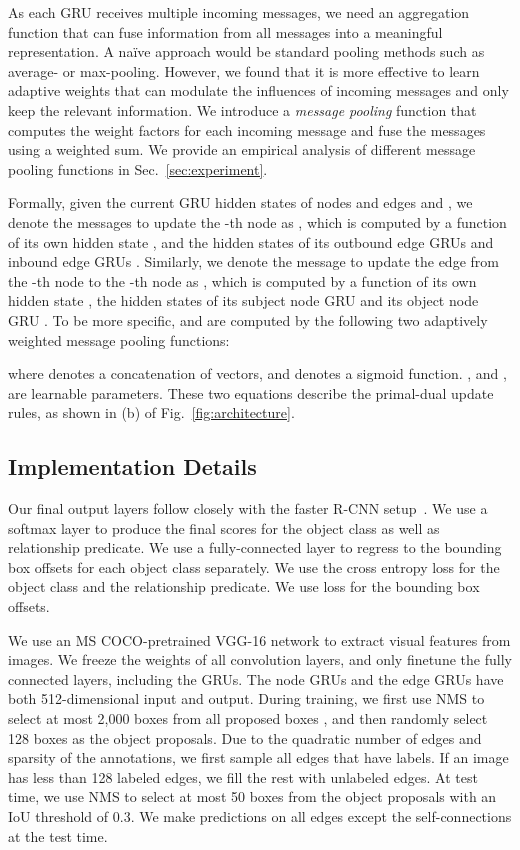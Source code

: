\documentclass[10pt,twocolumn,letterpaper]{article}
\begin{document}
As each GRU receives multiple incoming messages, we need an aggregation function that can fuse information from all messages into a meaningful representation.
A na\"{i}ve approach would be standard pooling methods such as average- or max-pooling. However, we found that it is more effective to learn adaptive weights that can modulate the influences of incoming messages and only keep the relevant information. We introduce a \emph{message pooling} function that computes the weight factors for each incoming message and  fuse the messages using a weighted sum. We provide an empirical analysis of different message pooling functions in Sec.~\ref{sec:experiment}. 

Formally, given the current GRU hidden states of nodes and edges  and ,
we denote the messages to update the -th node as , which is computed by a function of its own hidden state , and the hidden states of its outbound edge GRUs  and inbound edge GRUs . Similarly, we denote the message to update the edge from the -th node to the -th node as , which is computed by a function of its own hidden state , the hidden states of its subject node GRU  and its object node GRU . To be more specific,  and  are computed by the following two adaptively weighted message pooling functions: 




\noindent where  denotes a concatenation of vectors, and  denotes a sigmoid function. ,  and ,  are learnable parameters. These two equations describe the primal-dual update rules, as shown in (b) of Fig.~\ref{fig:architecture}.


\subsection{Implementation Details}
\label{sec:loss}
Our final output layers follow closely with the faster R-CNN setup~\cite{renNIPS15fasterrcnn}.
We use a softmax layer to produce the final scores for the object class as well as relationship predicate. We use a fully-connected layer to regress to the bounding box offsets for each object class separately. We use the cross entropy loss for the object class and the relationship predicate. We use  loss for the bounding box offsets.

We use an MS COCO-pretrained VGG-16 network to extract visual features from images. 
We freeze the weights of all convolution layers, and only finetune the fully connected layers, including the GRUs. The node GRUs and the edge GRUs have both 512-dimensional input and output. During training, we first use NMS to select at most 2,000 boxes from all proposed boxes , and then randomly select 128 boxes as the object proposals. Due to the quadratic number of edges and sparsity of the annotations, we first sample all edges that have labels. If an image has less than 128 labeled edges, we fill the rest with unlabeled edges. At test time, we use NMS to select at most 50 boxes from the object proposals with an IoU threshold of 0.3. We make predictions on all edges except the self-connections at the test time. 
\end{document}
